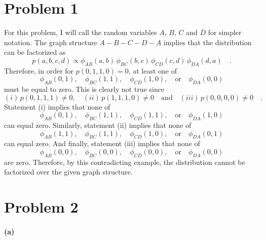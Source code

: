 \documentclass[11pt]{article}
\newcommand{\pr}[1]{\ensuremath{p(#1)}}
\begin{document}
\section{Problem 1}

For this problem, I will call the random variables $A$, $B$, $C$ and $D$ for
simpler notation. The graph structure $A-B-C-D-A$ implies that the distribution
can be factorized as
\begin{equation}
    \pr{a,b,c,d} \propto \phi_{AB}(a,b) \, \phi_{BC}(b,c) \, \phi_{CD}(c,d) \,
        \phi_{DA}(d,a) \quad .
\end{equation}
Therefore, in order for $\pr{0,1,1,0} = 0$, at least one of
\begin{equation}
    \phi_{AB}(0,1), \quad \phi_{BC}(1,1), \quad \phi_{CD}(1,0), \quad
    \mathrm{or}\quad
        \phi_{DA}(0,0)
\end{equation}
must be equal to zero. This is clearly not true since
\begin{equation}
    (i)\, \pr{0,1,1,1} \ne 0, \quad (ii)\, \pr{1,1,1,0} \ne 0\quad
    \mathrm{and}\quad
    (iii)\, \pr{0,0,0,0} \ne 0 \quad .
\end{equation}
Statement (i) implies that none of
\begin{equation}
    \phi_{AB}(0,1), \quad \phi_{BC}(1,1), \quad \phi_{CD}(1,1), \quad
    \mathrm{or}\quad \phi_{DA}(1,0)
\end{equation}
can equal zero. Similarly, statement (ii) implies that none of
\begin{equation}
    \phi_{AB}(1,1), \quad \phi_{BC}(1,1), \quad \phi_{CD}(1,0), \quad
    \mathrm{or}\quad \phi_{DA}(0,1)
\end{equation}
can equal zero. And finally, statement (iii) implies that none of
\begin{equation}
    \phi_{AB}(0,0), \quad \phi_{BC}(0,0), \quad \phi_{CD}(0,0), \quad
    \mathrm{or}\quad \phi_{DA}(0,0)
\end{equation}
are zero. Therefore, by this contradicting example, the distribution cannot
be factorized over the given graph structure.

\section{Problem 2}

\paragraph{(a)}
\end{document}
